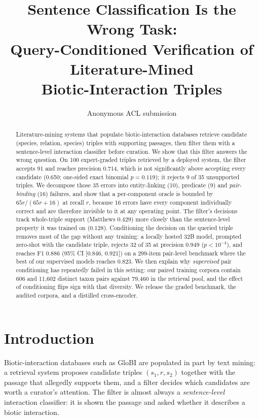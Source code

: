 \documentclass[11pt]{article}
\title{Sentence Classification Is the Wrong Task:\\
Query-Conditioned Verification of Literature-Mined\\Biotic-Interaction Triples}
\author{
  Anonymous ACL submission
}
\begin{document}
\maketitle

\begin{abstract}
Literature-mining systems that populate biotic-interaction databases retrieve candidate
(species, relation, species) triples with supporting passages, then filter them with a
sentence-level interaction classifier before curation. We show that this filter answers the
wrong question. On 100 expert-graded triples retrieved by a deployed system, the filter accepts
91 and reaches precision 0.714, which is not significantly above accepting every candidate
(0.650; one-sided exact binomial $p = 0.119$); it rejects 9 of 35 unsupported triples. We
decompose those 35 errors into entity-linking (10), predicate (9) and \emph{pair-binding} (16)
failures, and show that a per-component oracle is bounded by $65r/(65r+16)$ at recall $r$, because
16 errors have every component individually correct and are therefore invisible to it at any
operating point. The filter's decisions track whole-triple support (Matthews $0.429$) more closely
than the sentence-level property it was trained on ($0.128$). Conditioning the decision on the queried triple removes most of the gap without any
training: a locally hosted 32B model, prompted zero-shot with the candidate triple, rejects
32 of 35 at precision 0.949 ($p < 10^{-4}$), and reaches F1 0.886 (95\% CI [0.846, 0.921]) on a
299-item pair-level benchmark where the best of our supervised models reaches 0.823. We then
explain why \emph{supervised} pair conditioning has repeatedly failed in this setting: our
paired training corpora contain 606 and 11{,}602 distinct taxon pairs against 79{,}460 in the
retrieval pool, and the effect of conditioning flips sign with that diversity. We release the
graded benchmark, the audited corpora, and a distilled cross-encoder.
\end{abstract}

\section{Introduction}
\label{sec:intro}

Biotic-interaction databases such as GloBI \citep{poelen2014global} are populated in part by
text mining: a retrieval system proposes candidate triples $(s_1, r, s_2)$ together with the
passage that allegedly supports them, and a filter decides which candidates are worth a
curator's attention. The filter is almost always a \emph{sentence-level} interaction
classifier: it is shown the passage and asked whether it describes a biotic interaction.
\end{document}
